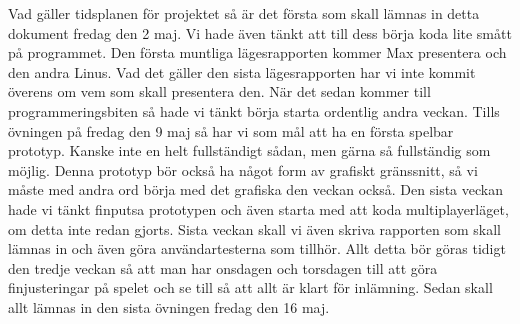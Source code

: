 \documentclass[10pt,a4paper]{article}
\begin{document}
Vad gäller tidsplanen för projektet så är det första som skall lämnas in
detta dokument fredag den 2 maj. Vi hade även tänkt att till dess börja
koda lite smått på programmet. Den första muntliga lägesrapporten kommer
Max presentera och den andra Linus. Vad det gäller den sista lägesrapporten
har vi inte kommit överens om vem som skall presentera den. När det sedan
kommer till programmeringsbiten så hade vi tänkt börja starta ordentlig
andra veckan. Tills övningen på fredag den 9 maj så har vi som mål att ha
en första spelbar prototyp. Kanske inte en helt fullständigt sådan, men
gärna så fullständig som möjlig. Denna prototyp bör också ha något form av
grafiskt gränssnitt, så vi måste med andra ord börja med det grafiska den
veckan också. Den sista veckan hade vi tänkt finputsa prototypen och även
starta med att koda multiplayerläget, om detta inte redan gjorts. Sista
veckan skall vi även skriva rapporten som skall lämnas in och även göra
användartesterna som tillhör. Allt detta bör göras tidigt den tredje veckan
så att man har onsdagen och torsdagen till att göra finjusteringar på
spelet och se till så att allt är klart för inlämning. Sedan skall allt
lämnas in den sista övningen fredag den 16 maj.
\end{document}
